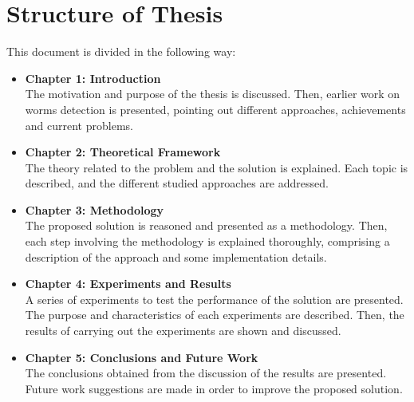 \section{Structure of Thesis}
This document is divided in the following way:
\begin{itemize}
\item \textbf{Chapter 1: Introduction}\\
  The motivation and purpose of the thesis is discussed. Then, earlier work
  on worms detection is presented, pointing out different approaches, achievements
  and current problems.
\item \textbf{Chapter 2: Theoretical Framework}\\
  The theory related to the problem and the solution is explained. Each topic is described,
  and the different studied approaches are addressed.
\item \textbf{Chapter 3: Methodology}\\
  The proposed solution is reasoned and presented as a methodology. Then, each step 
  involving the methodology is explained thoroughly, comprising a description of the 
  approach and some implementation details.
\item \textbf{Chapter 4: Experiments and Results}\\
  A series of experiments to test the performance of the solution are presented. 
  The purpose and characteristics of each experiments are described. Then, the results
  of carrying out the experiments are shown and discussed.
\item \textbf{Chapter 5: Conclusions and Future Work}\\
  The conclusions obtained from the discussion of the results are presented. Future
  work suggestions are made in order to improve the proposed solution.
\end{itemize}